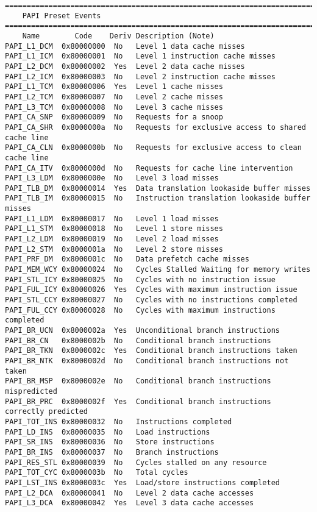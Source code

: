\begin{verbatim}
================================================================================
    PAPI Preset Events
================================================================================
    Name        Code    Deriv Description (Note)
PAPI_L1_DCM  0x80000000  No   Level 1 data cache misses
PAPI_L1_ICM  0x80000001  No   Level 1 instruction cache misses
PAPI_L2_DCM  0x80000002  Yes  Level 2 data cache misses
PAPI_L2_ICM  0x80000003  No   Level 2 instruction cache misses
PAPI_L1_TCM  0x80000006  Yes  Level 1 cache misses
PAPI_L2_TCM  0x80000007  No   Level 2 cache misses
PAPI_L3_TCM  0x80000008  No   Level 3 cache misses
PAPI_CA_SNP  0x80000009  No   Requests for a snoop
PAPI_CA_SHR  0x8000000a  No   Requests for exclusive access to shared cache line
PAPI_CA_CLN  0x8000000b  No   Requests for exclusive access to clean cache line
PAPI_CA_ITV  0x8000000d  No   Requests for cache line intervention
PAPI_L3_LDM  0x8000000e  No   Level 3 load misses
PAPI_TLB_DM  0x80000014  Yes  Data translation lookaside buffer misses
PAPI_TLB_IM  0x80000015  No   Instruction translation lookaside buffer misses
PAPI_L1_LDM  0x80000017  No   Level 1 load misses
PAPI_L1_STM  0x80000018  No   Level 1 store misses
PAPI_L2_LDM  0x80000019  No   Level 2 load misses
PAPI_L2_STM  0x8000001a  No   Level 2 store misses
PAPI_PRF_DM  0x8000001c  No   Data prefetch cache misses
PAPI_MEM_WCY 0x80000024  No   Cycles Stalled Waiting for memory writes
PAPI_STL_ICY 0x80000025  No   Cycles with no instruction issue
PAPI_FUL_ICY 0x80000026  Yes  Cycles with maximum instruction issue
PAPI_STL_CCY 0x80000027  No   Cycles with no instructions completed
PAPI_FUL_CCY 0x80000028  No   Cycles with maximum instructions completed
PAPI_BR_UCN  0x8000002a  Yes  Unconditional branch instructions
PAPI_BR_CN   0x8000002b  No   Conditional branch instructions
PAPI_BR_TKN  0x8000002c  Yes  Conditional branch instructions taken
PAPI_BR_NTK  0x8000002d  No   Conditional branch instructions not taken
PAPI_BR_MSP  0x8000002e  No   Conditional branch instructions mispredicted
PAPI_BR_PRC  0x8000002f  Yes  Conditional branch instructions correctly predicted
PAPI_TOT_INS 0x80000032  No   Instructions completed
PAPI_LD_INS  0x80000035  No   Load instructions
PAPI_SR_INS  0x80000036  No   Store instructions
PAPI_BR_INS  0x80000037  No   Branch instructions
PAPI_RES_STL 0x80000039  No   Cycles stalled on any resource
PAPI_TOT_CYC 0x8000003b  No   Total cycles
PAPI_LST_INS 0x8000003c  Yes  Load/store instructions completed
PAPI_L2_DCA  0x80000041  No   Level 2 data cache accesses
PAPI_L3_DCA  0x80000042  Yes  Level 3 data cache accesses

\end{verbatim}
